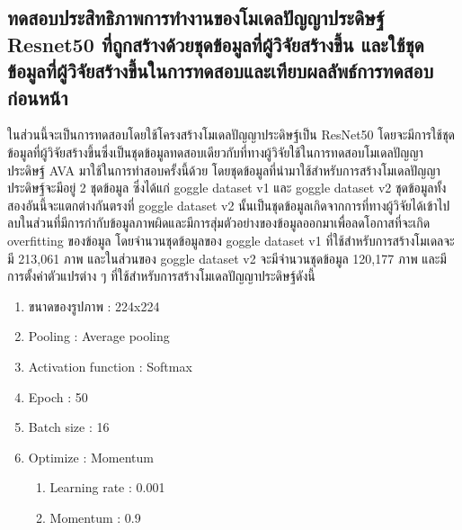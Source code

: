 \subsection{ทดสอบประสิทธิภาพการทำงานของโมเดลปัญญาประดิษฐ์ Resnet50 ที่ถูกสร้างด้วยชุดข้อมูลที่ผู้วิจัยสร้างขึ้น และใช้ชุดข้อมูลที่ผู้วิจัยสร้างขึ้นในการทดสอบและเทียบผลลัพธ์การทดสอบก่อนหน้า}
ในส่วนนี้จะเป็นการทดสอบโดยใช้โครงสร้างโมเดลปัญญาประดิษฐ์เป็น ResNet50 โดยจะมีการใช้ชุดข้อมูลที่ผู้วิจัยสร้างขึ้นซึ่งเป็นชุดข้อมูลทดสอบเดียวกับที่ทางผู้วิจัยใช้ในการทดสอบโมเดลปัญญาประดิษฐ์ AVA มาใช้ในการทำสอบครั้งนี้ด้วย โดยชุดข้อมูลที่นำมาใช้สำหรับการสร้างโมเดลปัญญาประดิษฐ์จะมีอยู่ 2 ชุดข้อมูล ซึ่งได้แก่ goggle dataset v1 และ goggle dataset v2 ชุดข้อมูลทั้งสองอันนี้จะแตกต่างกันตรงที่ goggle dataset v2 นั้นเป็นชุดข้อมูลเกิดจากการที่ทางผู้วิจัยได้เข้าไปลบในส่วนที่มีการกำกับข้อมูลภาพผิดและมีการสุ่มตัวอย่างของข้อมูลออกมาเพื่อลดโอกาสที่จะเกิด overfitting ของข้อมูล โดยจำนวนชุดข้อมูลของ goggle dataset v1 ที่ใช้สำหรับการสร้างโมเดลจะมี 213,061 ภาพ และในส่วนของ goggle dataset v2 จะมีจำนวนชุดข้อมูล 120,177 ภาพ และมีการตั้งค่าตัวแปรต่าง ๆ ที่ใช้สำหรับการสร้างโมเดลปัญญาประดิษฐ์ดังนี้
\begin{enumerate}
	\item ขนาดของรูปภาพ : 224x224
	\item Pooling : Average pooling
	\item Activation function : Softmax
	\item Epoch : 50
	\item Batch size : 16
	\item Optimize : Momentum
	\begin{enumerate}
		\item Learning rate : 0.001
		\item Momentum : 0.9
	\end{enumerate}
\end{enumerate}
